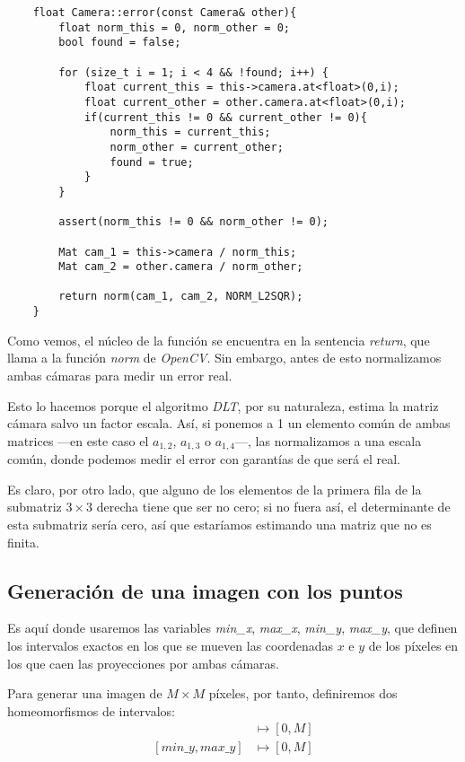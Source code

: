 \documentclass[a4paper, 11pt]{article}
\theoremstyle{definition}
\theoremstyle{theorem}
\begin{document}
    \begin{lstlisting}
    float Camera::error(const Camera& other){
        float norm_this = 0, norm_other = 0;
        bool found = false;

        for (size_t i = 1; i < 4 && !found; i++) {
            float current_this = this->camera.at<float>(0,i);
            float current_other = other.camera.at<float>(0,i);
            if(current_this != 0 && current_other != 0){
                norm_this = current_this;
                norm_other = current_other;
                found = true;
            }
        }

        assert(norm_this != 0 && norm_other != 0);

        Mat cam_1 = this->camera / norm_this;
        Mat cam_2 = other.camera / norm_other;

        return norm(cam_1, cam_2, NORM_L2SQR);
    }
    \end{lstlisting}

    Como vemos, el núcleo de la función se encuentra en la sentencia \emph{return}, que llama a la función \emph{norm} de \emph{OpenCV}. Sin embargo, antes de esto normalizamos ambas cámaras para medir un error real.

    Esto lo hacemos porque el algoritmo \emph{DLT}, por su naturaleza, estima la matriz cámara salvo un factor escala. Así, si ponemos a 1 un elemento común de ambas matrices ---en este caso el $a_{1,2}$, $a_{1,3}$ o $a_{1,4}$---, las normalizamos a una escala común, donde podemos medir el error con garantías de que será el real.

    Es claro, por otro lado, que alguno de los elementos de la primera fila de la submatriz $3\times3$ derecha tiene que ser no cero; si no fuera así, el determinante de esta submatriz sería cero, así que estaríamos estimando una matriz que no es finita.

    \subsection{Generación de una imagen con los puntos}
    Es aquí donde usaremos las variables \emph{min\_x}, \emph{max\_x}, \emph{min\_y}, \emph{max\_y}, que definen los intervalos exactos en los que se mueven las coordenadas $x$ e $y$ de los píxeles en los que caen las proyecciones por ambas cámaras.

    Para generar una imagen de $M \times M$ píxeles, por tanto, definiremos dos homeomorfismos de intervalos:
    \begin{align*}
        [min\_x, max\_x] &\longmapsto [0, M] \\
        [min\_y, max\_y] &\longmapsto [0, M]
    \end{align*}
\end{document}
